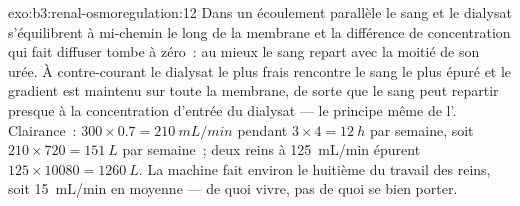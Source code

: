 \begin{solution}{exo:b3:renal-osmoregulation:12}
Dans un écoulement parallèle le sang et le dialysat s'équilibrent à
mi-chemin le long de la membrane et la différence de concentration qui
fait diffuser tombe à zéro~: au mieux le sang repart avec la moitié de
son urée. À contre-courant le dialysat le plus frais rencontre le sang
le plus épuré et le gradient est maintenu sur toute la membrane, de
sorte que le sang peut repartir presque à la concentration d'entrée du
dialysat --- le principe même de l'. Clairance~: $300\times 0.7 =
\qty{210}{mL/min}$ pendant $3\times 4 = \qty{12}{h}$ par semaine, soit
$210\times 720 = \qty{151}{L}$ par semaine~; deux reins à
\qty{125}{mL/min} épurent $125\times\num{10080} = \qty{1260}{L}$. La
machine fait environ le huitième du travail des reins, soit
\qty{15}{mL/min} en moyenne --- de quoi vivre, pas de quoi se bien
porter.
\end{solution}

